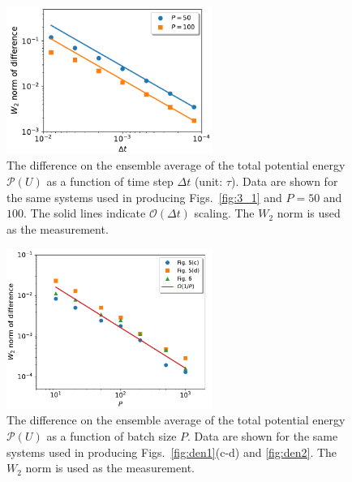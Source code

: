 \begin{figure}[!ht]
\begin{center}
\includegraphics[width=0.6\textwidth]{figs/Energy_3_1.pdf}
\caption{ {The difference on the ensemble average of the total potential energy $\mathscr{P}(U)$ as a function of time step $\Delta t$ (unit: $\tau$). Data are shown for the same systems used in producing Figs.~\ref{fig:3_1} and $P=50$ and $100$. The solid lines indicate $\mathcal{O}(\Delta t)$ scaling. The $W_2$ norm is used as the measurement.}}
\label{fig:energy2d_3_1}
\end{center} 
\end{figure}

\begin{figure}[htb]
\begin{center}
\includegraphics[width=0.6\textwidth]{figs/Energy.pdf}
\caption{The difference on the ensemble average of the total potential energy $\mathscr{P}(U)$ as a function of batch size $P$. Data are shown for the same systems used in producing Figs.~\ref{fig:den1}(c-d) and \ref{fig:den2}. The $W_2$ norm is used as the measurement.}
\label{fig:energy2d}
\end{center} 
\end{figure}

